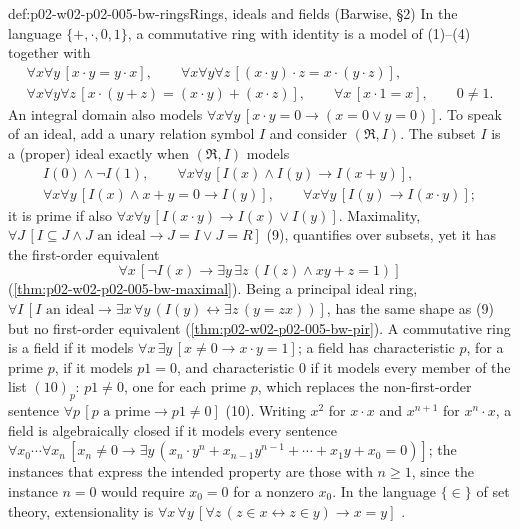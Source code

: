 \begin{hbexample}{def:p02-w02-p02-005-bw-rings}{Rings, ideals and fields (Barwise, \S2)}
In the language \(\{+,\cdot,0,1\}\), a commutative ring with identity is a
model of (1)--(4) together with
\[
\begin{gathered}
\forall x\forall y\,[x\cdot y=y\cdot x],\qquad
\forall x\forall y\forall z\,[(x\cdot y)\cdot z=x\cdot(y\cdot z)],\\
\forall x\forall y\forall z\,[x\cdot(y+z)=(x\cdot y)+(x\cdot z)],\qquad
\forall x\,[x\cdot1=x],\qquad 0\neq1.
\end{gathered}
\]
An integral domain also models
\(\forall x\forall y\,[x\cdot y=0\to(x=0\lor y=0)]\).  To speak of an ideal,
add a unary relation symbol \(I\) and consider \((\mathfrak R,I)\).  The
subset \(I\) is a (proper) ideal exactly when \((\mathfrak R,I)\) models
\[
\begin{gathered}
I(0)\land\neg I(1),\qquad
\forall x\forall y\,[I(x)\land I(y)\to I(x+y)],\\
\forall x\forall y\,[I(x)\land x+y=0\to I(y)],\qquad
\forall x\forall y\,[I(y)\to I(x\cdot y)];
\end{gathered}
\]
it is prime if also \(\forall x\forall y\,[I(x\cdot y)\to I(x)\lor I(y)]\).
Maximality, \(\forall J\,[I\subseteq J\land J\text{ an ideal}\to J=I\lor
J=R]\) (9), quantifies over subsets, yet it has the first-order equivalent
\[
\forall x\,[\neg I(x)\to\exists y\,\exists z\,(I(z)\land x y+z=1)]
\tag*{(9)\('\)}
\]
(\cref{thm:p02-w02-p02-005-bw-maximal}).  Being a principal ideal ring,
\(\forall I\,[I\text{ an ideal}\to\exists x\,\forall y\,(I(y)\leftrightarrow
\exists z\,(y=zx))]\), has the same shape as (9) but no first-order
equivalent (\cref{thm:p02-w02-p02-005-bw-pir}).  A commutative ring is a
field if it models \(\forall x\,\exists y\,[x\neq0\to x\cdot y=1]\); a field
has characteristic \(p\), for a prime \(p\), if it models \(p1=0\), and
characteristic \(0\) if it models every member of the list
\((10)_p\): \(p1\neq0\), one for each prime \(p\), which replaces the
non-first-order sentence \(\forall p\,[p\text{ a prime}\to p1\neq0]\) (10).
Writing \(x^2\) for \(x\cdot x\) and \(x^{n+1}\) for \(x^n\cdot x\), a field
is algebraically closed if it models every sentence
\(\forall x_0\cdots\forall x_n\,[x_n\neq0\to\exists y\,(x_n\cdot y^n+
x_{n-1}y^{n-1}+\cdots+x_1y+x_0=0)]\); the instances that express the
intended property are those with \(n\geq1\), since the instance \(n=0\)
would require \(x_0=0\) for a nonzero \(x_0\).  In the language \(\{\in\}\)
of set theory, extensionality is
\(\forall x\,\forall y\,[\forall z\,(z\in x\leftrightarrow z\in y)\to x=y]\)
\cite[ch.~A.1, \S2, pp.~13--15]{Barwise1977FirstOrder}.
\end{hbexample}

